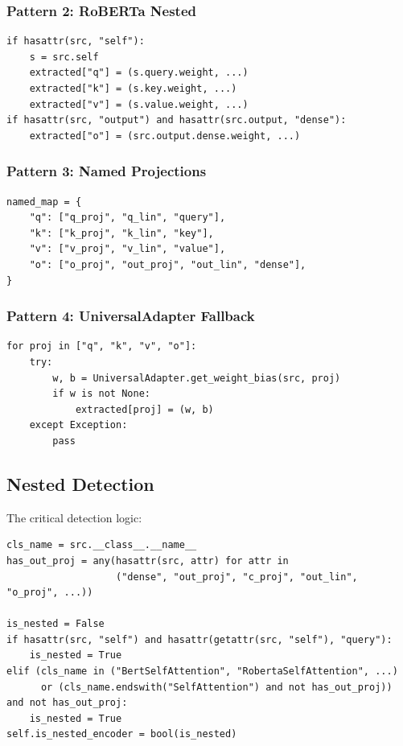 \subsubsection{Pattern 2: RoBERTa Nested}

\begin{lstlisting}
if hasattr(src, "self"):
    s = src.self
    extracted["q"] = (s.query.weight, ...)
    extracted["k"] = (s.key.weight, ...)
    extracted["v"] = (s.value.weight, ...)
if hasattr(src, "output") and hasattr(src.output, "dense"):
    extracted["o"] = (src.output.dense.weight, ...)
\end{lstlisting}

\subsubsection{Pattern 3: Named Projections}

\begin{lstlisting}
named_map = {
    "q": ["q_proj", "q_lin", "query"],
    "k": ["k_proj", "k_lin", "key"],
    "v": ["v_proj", "v_lin", "value"],
    "o": ["o_proj", "out_proj", "out_lin", "dense"],
}
\end{lstlisting}

\subsubsection{Pattern 4: UniversalAdapter Fallback}

\begin{lstlisting}
for proj in ["q", "k", "v", "o"]:
    try:
        w, b = UniversalAdapter.get_weight_bias(src, proj)
        if w is not None:
            extracted[proj] = (w, b)
    except Exception:
        pass
\end{lstlisting}

\subsection{Nested Detection}

The critical detection logic:

\begin{lstlisting}
cls_name = src.__class__.__name__
has_out_proj = any(hasattr(src, attr) for attr in 
                   ("dense", "out_proj", "c_proj", "out_lin", "o_proj", ...))

is_nested = False
if hasattr(src, "self") and hasattr(getattr(src, "self"), "query"):
    is_nested = True
elif (cls_name in ("BertSelfAttention", "RobertaSelfAttention", ...)
      or (cls_name.endswith("SelfAttention") and not has_out_proj)) and not has_out_proj:
    is_nested = True
self.is_nested_encoder = bool(is_nested)
\end{lstlisting}


